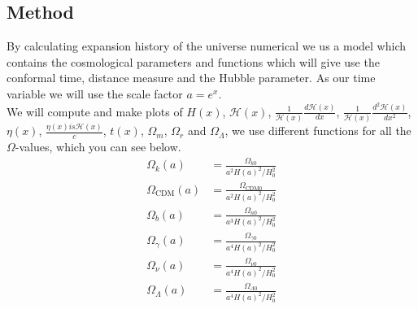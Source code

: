 \documentclass{aa}
\begin{document}
\subsection{Method}
By calculating expansion history of the universe numerical we us a model which contains the cosmological parameters and functions which will give use the conformal time, distance measure and the Hubble parameter. As our time variable we will use the scale factor $a=e^{x}$.   
\\
We will compute and make plots of $H(x)$, $\mathcal{H}(x)$, $\frac{1}{\mathcal{H}(x)}\frac{d\mathcal{H}(x)}{dx}$, $\frac{1}{\mathcal{H}(x)}\frac{d^2\mathcal{H}(x)}{dx^2}$, $\eta(x)$, $\frac{\eta(x) is \mathcal{H}(x)}{c}$, $t(x)$, $\Omega_m$, $\Omega_r$ and $\Omega_\Lambda$, we use different functions for all the $\Omega$-values, which you can see below. 
\begin{align}
    \Omega_{k}(a)&=\frac{\Omega_{k0}}{a^2H(a)^2/H_0^2} \label{eq:Omega_k}\\
    \Omega_{\text{CDM}}(a)&=\frac{\Omega_{\text{CDM}0}}{a^2H(a)^2/H_0^2} \label{eq:Omega_CDM}\\
    \Omega_{b}(a)&=\frac{\Omega_{n0}}{a^3H(a)^2/H_0^2} \label{eq:Omega_b}\\
    \Omega_{\gamma}(a)&=\frac{\Omega_{\gamma0}}{a^4H(a)^2/H_0^2} \label{eq:Omega_gamma}\\
    \Omega_{\nu}(a)&=\frac{\Omega_{\nu0}}{a^4H(a)^2/H_0^2} \label{eq:Omega_nu}\\
    \Omega_{\Lambda}(a)&=\frac{\Omega_{\Lambda0}}{a^4H(a)^2/H_0^2} \label{eq:Omega_lambda}
\end{align}
\end{document}
